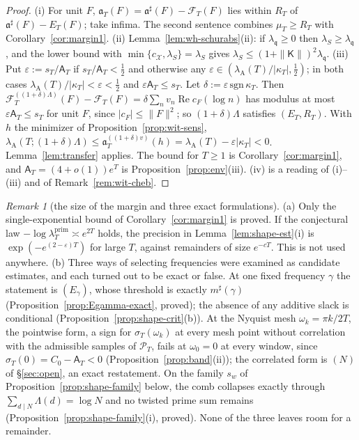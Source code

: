 \documentclass[11pt]{amsart}
\theoremstyle{definition}
\theoremstyle{remark}
\newtheorem{remark}[theorem]{Remark}
\newcommand{\Rel}{\operatorname{Re}}
\newcommand{\PT}{\mathcal P_T}
\newcommand{\lamP}{\lambda^{\mathrm{prim}}_T}
\newcommand{\lamA}{\lambda_{\mathrm A}(T)}
\newcommand{\sT}{\sigma_T}
\newcommand{\cF}{c_F}
\newcommand{\Aconst}{\mathsf A_T}
\begin{document}
\begin{proof}
(i) For unit $F$, $\mathfrak a_T(F)=\mathfrak a^\sharp(F)-\mathcal F_T(F)$ lies within $R_T$ of $\mathfrak a^\sharp(F)-E_T(F)$; take
infima. The second sentence combines $\mu_T\ge R_T$ with Corollary~\ref{cor:margin1}. (ii) Lemma~\ref{lem:wh-schurabs}(ii): if
$\lambda_{\mathfrak q}\ge0$ then $\lambda_S\ge\lambda_{\mathfrak q}$, and the lower bound with $\min\{c_{\mathcal X},\lambda_S\}=\lambda_S$
gives $\lambda_S\le(1+\|\mathsf K\|)^2\lambda_{\mathfrak q}$. (iii) Put $\varepsilon:=s_T/\Aconst$ if $s_T/\Aconst<\frac12$ and otherwise any
$\varepsilon\in(\lamA/|\kappa_T|,\frac12)$; in both cases $\lamA/|\kappa_T|<\varepsilon<\frac12$ and $\varepsilon\Aconst\le s_T$. Let
$\delta:=\varepsilon\,\mathrm{sgn}\,\kappa_T$. Then $\mathcal F^{((1+\delta)\Lambda)}_T(F)-\mathcal F_T(F)=\delta\sum_nv_n\Rel\cF(\log n)$ has
modulus at most $\varepsilon\Aconst\le s_T$ for unit $F$, since $|\cF|\le\|F\|^2$; so $(1+\delta)\Lambda$ satisfies $(E_T,R_T)$. With $h$ the
minimizer of Proposition~\ref{prop:wit-sens}, $\lambda_{\mathrm A}(T;(1+\delta)\Lambda)\le\mathfrak a^{((1+\delta)v)}_T(h)=\lamA-\varepsilon|\kappa_T|<0$.
Lemma~\ref{lem:transfer} applies. The bound for $T\ge1$ is Corollary~\ref{cor:margin1}, and $\Aconst=(4+o(1))e^T$ is
Proposition~\ref{prop:env}(iii). (iv) is a reading of (i)--(iii) and of
Remark~\ref{rem:wit-cheb}.
\end{proof}

\begin{remark}[the size of the margin and three exact formulations]\label{rem:shape-est}
(a) Only the single-exponential bound of Corollary~\ref{cor:margin1} is proved. If the conjectural law $-\log\lamP\asymp e^{2T}$
\cite{Zhu2026} holds, the precision in Lemma~\ref{lem:shape-est}(i) is $\exp(-e^{(2-\varepsilon)T})$ for large $T$, against remainders of
size $e^{-cT}$. This is not used anywhere.
(b) Three ways of selecting frequencies were examined as candidate estimates, and each turned out to be exact or false. At one fixed
frequency $\gamma$ the statement is $(E_\gamma)$, whose threshold is exactly $m^\sharp(\gamma)$ (Proposition~\ref{prop:Egamma-exact}, proved);
the absence of any additive slack is conditional (Proposition~\ref{prop:shape-crit}(b)). At the Nyquist mesh $\omega_k=\pi k/2T$, the pointwise form, a sign for $\sT(\omega_k)$ at every mesh point without correlation
with the admissible samples of $\PT$, fails at $\omega_0=0$ at every window, since $\sT(0)=C_0-\Aconst<0$ (Proposition~\ref{prop:band}(ii)); the correlated form is $(N)$ of \S\ref{sec:open}, an exact restatement.
On the family $s_w$ of Proposition~\ref{prop:shape-family} below, the comb collapses exactly through $\sum_{d\mid N}\Lambda(d)=\log N$ and
no twisted prime sum remains (Proposition~\ref{prop:shape-family}(i), proved). None of the three leaves room for a remainder.
\end{remark}
\end{document}
